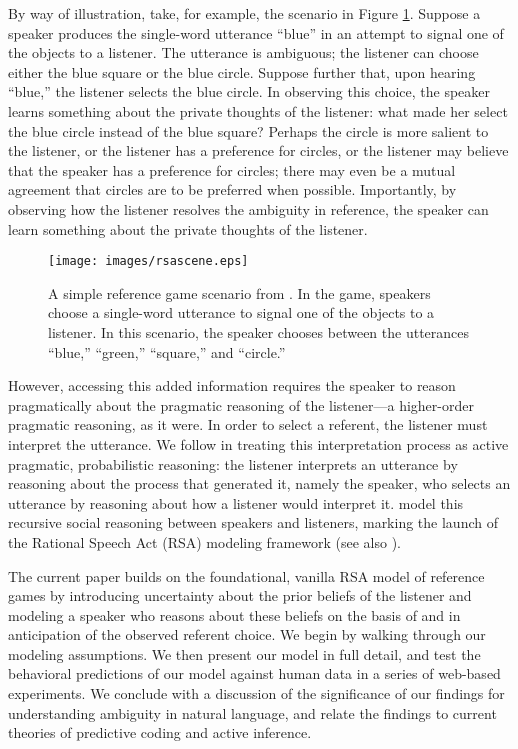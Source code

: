 \documentclass[10pt,a4paper]{article}
\begin{document}
By way of illustration, take, for example, the scenario in Figure \ref{FG-ref-game}. Suppose a speaker produces the single-word utterance ``blue'' in an attempt to signal one of the objects to a listener. The utterance is ambiguous; the listener can choose either the blue square or the blue circle. Suppose further that, upon hearing ``blue,'' the listener selects the blue circle. In observing this choice, the speaker learns something about the private thoughts of the listener: what made her select the blue circle instead of the blue square? Perhaps the circle is more salient to the listener, or the listener has a preference for circles, or the listener may believe that the speaker has a preference for circles; there may even be a mutual agreement that circles are to be preferred when possible. Importantly, by observing how the listener resolves the ambiguity in reference, the speaker can learn something about the private thoughts of the listener. 

\begin{figure}
	\centering
	\texttt{[image: images/rsascene.eps]}
	\caption{A simple reference game scenario from \protect{}. In the game, speakers choose a single-word utterance to signal one of the objects to a listener. In this scenario, the speaker chooses between the utterances ``blue,'' ``green,'' ``square,'' and ``circle.''}
	\label{FG-ref-game}
\end{figure}

However, accessing this added information requires the speaker to reason pragmatically about the pragmatic reasoning of the listener---a higher-order pragmatic reasoning, as it were. In order to select a referent, the listener must interpret the utterance. We follow  in treating this interpretation process as active pragmatic, probabilistic reasoning: the listener interprets an utterance by reasoning about the process that generated it, namely the speaker, who selects an utterance by reasoning about how a listener would interpret it. \citeauthor{frankgoodman2012} model this recursive social reasoning between speakers and listeners, marking the launch of the Rational Speech Act (RSA) modeling framework (see also ).

The current paper builds on the foundational, vanilla RSA model of reference games by introducing uncertainty about the prior beliefs of the listener and modeling a speaker who reasons about these beliefs on the basis of and in anticipation of the observed referent choice. 
We begin by walking through our modeling assumptions. 
We then present our model in full detail, and test the behavioral predictions of our model against human data in a series of web-based experiments.
We conclude with a discussion of the significance of our findings for understanding ambiguity in natural language, and relate the findings to current theories of predictive coding and active inference.
\end{document}
